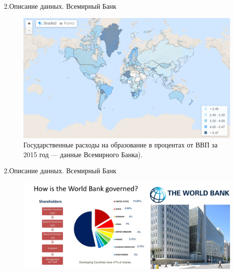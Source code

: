 \documentclass[aspectratio=169]{beamer}
\begin{document}
\begin{frame}{2.Описание данных. Всемирный Банк}
\begin{figure} \label{hompic}
            \centering
            \includegraphics[scale=0.3]{education.png}
            \caption{Государственные расходы на образование в процентах от ВВП за 2015 год --- данные Всемирного Банка).}
            
        \end{figure}
\end{frame}

\begin{frame}{2.Описание данных. Всемирный Банк}
\begin{figure} \label{hompic}
            \centering
            \includegraphics[scale=0.4]{Union4.png}
    \end{figure}
\end{frame}
\end{document}

